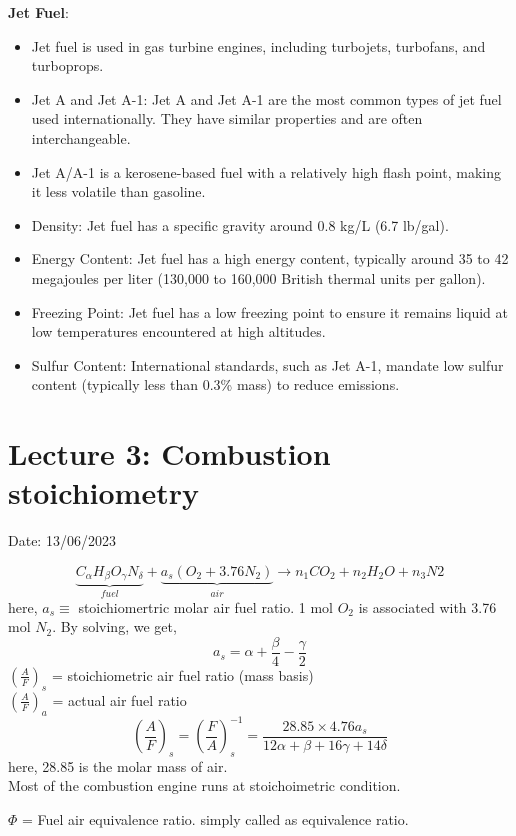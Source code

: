 \documentclass{article}
\begin{document}
\textbf{Jet Fuel}:
\begin{itemize}
  \item Jet fuel is used in gas turbine engines, including turbojets, turbofans, and turboprops.
  \item Jet A and Jet A-1: Jet A and Jet A-1 are the most common types of jet fuel used internationally. They have similar properties and are often interchangeable.
  \item Jet A/A-1 is a kerosene-based fuel with a relatively high flash point, making it less volatile than gasoline.
  \item Density: Jet fuel has a specific gravity around 0.8 kg/L (6.7 lb/gal).
  \item Energy Content: Jet fuel has a high energy content, typically around 35 to 42 megajoules per liter (130,000 to 160,000 British thermal units per gallon).
  \item Freezing Point: Jet fuel has a low freezing point to ensure it remains liquid at low temperatures encountered at high altitudes.
  \item Sulfur Content: International standards, such as Jet A-1, mandate low sulfur content (typically less than 0.3\% mass) to reduce emissions.
\end{itemize}



\newpage

\section{Lecture 3: Combustion stoichiometry}
\hfill{Date: 13/06/2023}

$$\underbrace{C_\alpha H_\beta O_\gamma N_\delta}_{fuel} + \underbrace{a_s \left(O_2 + 3.76 N_2\right)}_{air} \rightarrow n_1CO_2 + n_2H_2O + n_3N2$$ 
here, $a_s \equiv$ stoichiomertric molar air fuel ratio. 1 mol $O_2$ is associated with 3.76 mol $N_2$. By solving, we get,
$$a_s = \alpha + \frac{\beta}{4} - \frac{\gamma}{2}$$
$\left(\frac{A}{F}\right)_s$ = stoichiometric air fuel ratio (mass basis) \\
$\left(\frac{A}{F}\right)_a$ = actual air fuel ratio 
$$\left(\frac{A}{F}\right)_s = \left(\frac{F}{A}\right)_s^{-1} = \frac{28.85\times 4.76 a_s}{12\alpha + \beta + 16 \gamma + 14 \delta}$$
here, 28.85 is the molar mass of air. \\
Most of the combustion engine runs at stoichoimetric condition. 

$\Phi$ = Fuel air equivalence ratio. simply called as equivalence ratio. 
\end{document}
